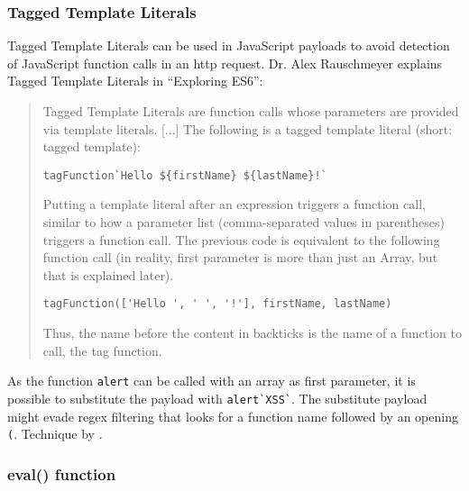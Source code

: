 \subsubsection{Tagged Template Literals}
Tagged Template Literals can be used in JavaScript payloads to avoid detection of JavaScript function calls in an http request. Dr. Alex Rauschmeyer explains Tagged Template Literals in ``Exploring ES6'':
\begin{quotation} Tagged Template Literals are function calls whose parameters are provided via template literals. [...]
	The following is a tagged template literal (short: tagged template):
	\begin{lstlisting}
tagFunction`Hello ${firstName} ${lastName}!`
\end{lstlisting}
	Putting a template literal after an expression triggers a function call, similar to how a parameter list (comma-separated values in parentheses) triggers a function call. The previous code is equivalent to the following function call (in reality, first parameter is more than just an Array, but that is explained later).
	\begin{lstlisting}
tagFunction(['Hello ', ' ', '!'], firstName, lastName)
\end{lstlisting}
	Thus, the name before the content in backticks is the name of a function to call, the tag function.
	\cite{exploringes6/templatelit}
\end{quotation}

As the function \verb|alert| can be called with an array as first parameter, it is possible to substitute the payload with \verb|alert`XSS`|. The substitute payload might evade regex filtering that looks for a function name followed by an opening \verb|(|.
Technique by \cite{onecons/wafbypass}.


\subsubsection{eval() function}
\label{sec:eval}

